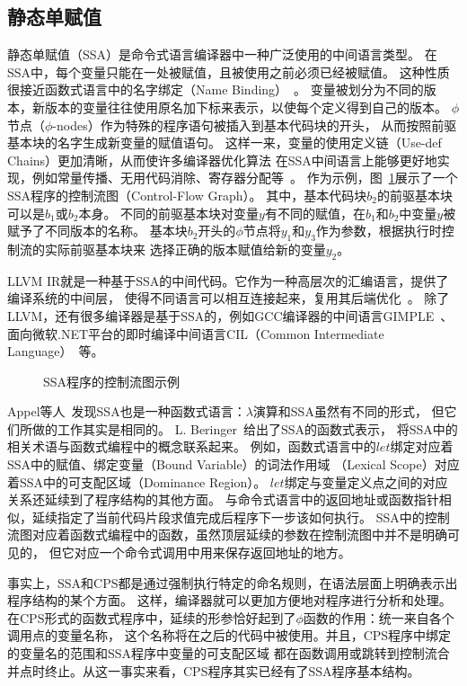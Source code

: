 \subsection{静态单赋值} \label{sec:bg_ssa}

静态单赋值（SSA）是命令式语言编译器中一种广泛使用的中间语言类型。
在SSA中，每个变量只能在一处被赋值，且被使用之前必须已经被赋值。
这种性质很接近函数式语言中的名字绑定（Name Binding）~\cite{ssabook}。
变量被划分为不同的版本，新版本的变量往往使用原名加下标来表示，以使每个定义得到自己的版本。
$\phi$节点（$\phi$-nodes）作为特殊的程序语句被插入到基本代码块的开头，
从而按照前驱基本块的名字生成新变量的赋值语句。
这样一来，变量的使用定义链（Use-def Chains）更加清晰，从而使许多编译器优化算法
在SSA中间语言上能够更好地实现，例如常量传播、无用代码消除、寄存器分配等~\cite{ssabook,kelsey1995correspondence}。
作为示例，图~\ref{ssacfg}展示了一个SSA程序的控制流图（Control-Flow Graph）。
其中，基本代码块$b_2$的前驱基本块可以是$b_1$或$b_2$本身。
不同的前驱基本块对变量$y$有不同的赋值，在$b_1$和$b_2$中变量$y$被赋予了不同版本的名称。
基本块$b_2$开头的$\phi$节点将$y_1$和$y_3$作为参数，根据执行时控制流的实际前驱基本块来
选择正确的版本赋值给新的变量$y_2$。

LLVM IR就是一种基于SSA的中间代码。它作为一种高层次的汇编语言，提供了编译系统的中间层，
使得不同语言可以相互连接起来，复用其后端优化~\cite{lattner2006introduction}。
除了LLVM，还有很多编译器是基于SSA的，例如GCC编译器的中间语言GIMPLE~\cite{callanan2007extending}、
面向微软.NET平台的即时编译中间语言CIL（Common Intermediate Language）~\cite{thai2003net}等。

\begin{figure}[htbp]
    \centering
    
    \caption{SSA程序的控制流图示例}\label{ssacfg}
\end{figure}

Appel等人~\cite{appel1998ssa}发现SSA也是一种函数式语言：$\lambda$演算和SSA虽然有不同的形式，
但它们所做的工作其实是相同的。
L. Beringer~\cite{ssabook}给出了SSA的函数式表示，
将SSA中的相关术语与函数式编程中的概念联系起来。
例如，函数式语言中的$let$绑定对应着SSA中的赋值、绑定变量（Bound Variable）的词法作用域
（Lexical Scope）对应着SSA中的可支配区域（Dominance Region）。
$let$绑定与变量定义点之间的对应关系还延续到了程序结构的其他方面。
与命令式语言中的返回地址或函数指针相似，延续指定了当前代码片段求值完成后程序下一步该如何执行。
SSA中的控制流图对应着函数式编程中的函数，虽然顶层延续的参数在控制流图中并不是明确可见的，
但它对应一个命令式调用中用来保存返回地址的地方。

事实上，SSA和CPS都是通过强制执行特定的命名规则，在语法层面上明确表示出程序结构的某个方面。
这样，编译器就可以更加方便地对程序进行分析和处理。
在CPS形式的函数式程序中，延续的形参恰好起到了$\phi$函数的作用：统一来自各个调用点的变量名称，
这个名称将在之后的代码中被使用。并且，CPS程序中绑定的变量名的范围和SSA程序中变量的可支配区域
都在函数调用或跳转到控制流合并点时终止。从这一事实来看，CPS程序其实已经有了SSA程序基本结构。

